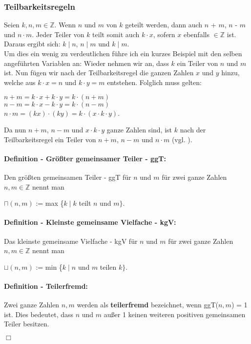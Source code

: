 \documentclass[german,12pt,a4paper]{article}
\begin{document}
\subsubsection{Teilbarkeitsregeln}\label{Teilbarkeitsregeln}
Seien $k, n, m \in \mathbb{Z}$.
Wenn $n$ und $m$ von $k$ geteilt werden, dann auch $n$ + $m$,\newline
$n$ - $m$ und $n\cdot m$. Jeder Teiler von $k$ teilt somit auch $k \cdot x$, sofern $x$ ebenfalls $\in \mathbb{Z}$ ist.
Daraus ergibt sich: $k \mid n$, $n \mid m$ und $k \mid m$.\\
Um dies ein wenig zu verdeutlichen führe ich ein kurzes Beispiel mit den selben angeführten Variablen an:
Wieder nehmen wir an, dass $k$ ein Teiler von $n$ und $m$ ist.
Nun fügen wir nach der Teilbarkeitsregel die ganzen Zahlen $x$ und $y$ hinzu, welche aus $k \cdot x = n$ und $k \cdot y = m$ entstehen.
Folglich muss gelten:
\begin{center}
$n + m = k \cdot x + k \cdot y = k \cdot (n + m)$\\
$n - m = k \cdot x - k \cdot y = k \cdot (n - m)$\\
$n \cdot m = (kx) \cdot (ky) = k \cdot (x \cdot k \cdot y)$.
\end{center}
Da nun $n + m$, $n - m$ und $x \cdot k \cdot y$ ganze Zahlen sind, ist $k$ nach der Teilbarkeitsregel ein Teiler von $n + m$, $n - m$ und $n \cdot m$ (vgl. \cite[13--15]{RempeGillen2009}).
\paragraph{Definition - Größter gemeinsamer Teiler - ggT:}
Den größten gemeinsamen Teiler - ggT für $n$ und $m$ für zwei ganze Zahlen $n, m\in \mathbb{Z}$ nennt man
\begin{center}
$\sqcap(n, m)$ := max \{$k \mid k$ teilt $n$ und $m\}$.
\end{center}
\paragraph{Definition - Kleinste gemeinsame Vielfache - kgV:}
Das kleinste gemeinsame Vielfache - kgV für $n$ und $m$ für zwei ganze Zahlen $n, m\in \mathbb{Z}$ nennt man
\begin{center}
$\sqcup(n, m)$ := min \{$k \mid n$ und $m$ teilen $k\}$.
\end{center}
\paragraph{Definition - Teilerfremd:}
Zwei ganze Zahlen $n, m$ werden als \textbf{teilerfremd} bezeichnet, wenn ggT($n, m$) = 1 ist.
Dies bedeutet, dass $n$ und $m$ außer 1 keinen weiteren positiven gemeinsamen Teiler besitzen.
\begin{flushright}
$\Box$
\end{flushright}
\newpage
\end{document}
